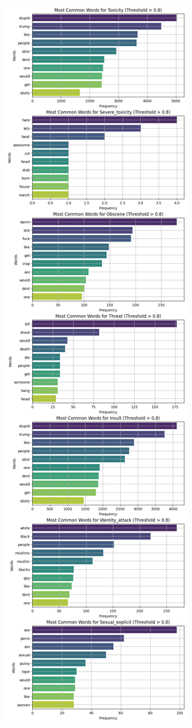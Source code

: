 \documentclass[10pt,a4paper,oneside]{article} %
\begin{document}
\begin{enumerate}
\begin{figure}[h]
\begin{subfigure}{0.49\textwidth}
        \includegraphics[width=\textwidth, clip, trim=0 290 0 1440]{replibert/replibert/plots/Word_Frequency_cc.png}

\end{subfigure}
\end{figure}
\end{enumerate}
\end{document}
